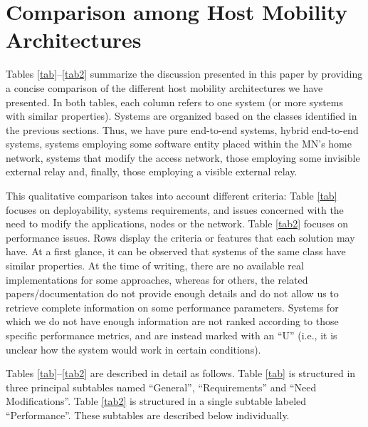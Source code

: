 \documentclass[preprint,12pt]{elsarticle}
\begin{document}
\section{Comparison among Host Mobility Architectures}
\label{sec:comparison}

Tables \ref{tab}--\ref{tab2} summarize the discussion presented in this paper 
by providing a concise comparison of the different host mobility 
architectures we have presented.  
In both tables, each column refers to one system (or more systems 
with similar properties). 
Systems are organized based on the classes identified in the previous 
sections. Thus, we have pure end-to-end systems, hybrid end-to-end systems, 
systems employing some software entity placed within the MN's home network, 
systems that modify the access network, those employing some invisible external 
relay and, finally, those employing a visible external relay.

This qualitative comparison takes into account different criteria: Table 
\ref{tab} focuses on deployability, systems requirements, and issues concerned 
with the need to modify the applications, nodes or the 
network. 
Table \ref{tab2} focuses on performance issues. Rows display 
the criteria or features that each solution may have.
At a first glance, it can be observed that systems of the same class have 
similar properties.
At the time of writing, there are no available real implementations for some approaches, whereas for others, the related papers/documentation do not provide enough details and do not allow us to retrieve complete information on some performance parameters. 
Systems for which we do not have enough information are not ranked according to those specific performance metrics, and are instead marked with an “U” (i.e., it is unclear how the system would work in certain conditions).

Tables \ref{tab}--\ref{tab2} are described in detail as follows.
Table \ref{tab} is structured in three principal subtables named ``General'', ``Requirements'' and ``Need Modifications''. 
Table \ref{tab2} is structured in a single subtable labeled ``Performance''.
These subtables are described below individually.
\end{document}
